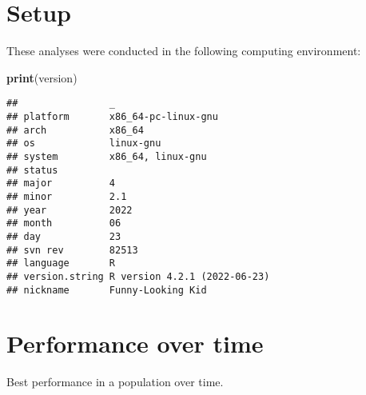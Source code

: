 \documentclass[]{book}
\newenvironment{Shaded}{\begin{snugshade}}{\end{snugshade}}
\newcommand{\CharTok}[1]{\textcolor[rgb]{0.31,0.60,0.02}{#1}}
\newcommand{\DataTypeTok}[1]{\textcolor[rgb]{0.13,0.29,0.53}{#1}}
\newcommand{\KeywordTok}[1]{\textcolor[rgb]{0.13,0.29,0.53}{\textbf{#1}}}
\newcommand{\NormalTok}[1]{#1}
\newcommand{\OperatorTok}[1]{\textcolor[rgb]{0.81,0.36,0.00}{\textbf{#1}}}
\newcommand{\StringTok}[1]{\textcolor[rgb]{0.31,0.60,0.02}{#1}}
\begin{document}
\hypertarget{setup}{%
\section{Setup}\label{setup}}

These analyses were conducted in the following computing environment:

\begin{Shaded}
\begin{Highlighting}[]
\KeywordTok{print}\NormalTok{(version)}
\end{Highlighting}
\end{Shaded}

\begin{verbatim}
##                _                           
## platform       x86_64-pc-linux-gnu         
## arch           x86_64                      
## os             linux-gnu                   
## system         x86_64, linux-gnu           
## status                                     
## major          4                           
## minor          2.1                         
## year           2022                        
## month          06                          
## day            23                          
## svn rev        82513                       
## language       R                           
## version.string R version 4.2.1 (2022-06-23)
## nickname       Funny-Looking Kid
\end{verbatim}

\hypertarget{performance-over-time}{%
\section{Performance over time}\label{performance-over-time}}

Best performance in a population over time.

\begin{Shaded}
\end{Shaded}
\end{document}
